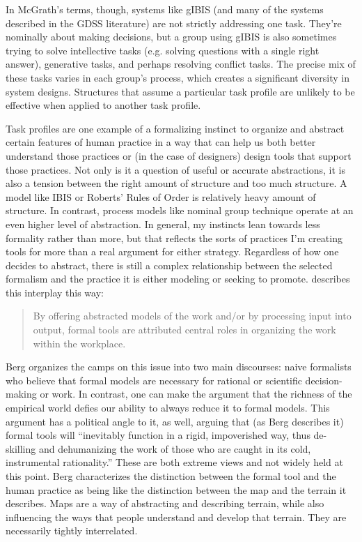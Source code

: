 In McGrath's terms, though, systems like gIBIS (and many of the systems described in the GDSS literature) are not strictly addressing one task. They're nominally about making decisions, but a group using gIBIS is also sometimes trying to solve intellective tasks (e.g. solving questions with a single right answer), generative tasks, and perhaps resolving conflict tasks. The precise mix of these tasks varies in each group's process, which creates a significant diversity in system designs. Structures that assume a particular task profile are unlikely to be effective when applied to another task profile.

Task profiles are one example of a formalizing instinct to organize and abstract certain features of human practice in a way that can help us both better understand those practices or (in the case of designers) design tools that support those practices. Not only is it a question of useful or accurate abstractions, it is also a tension between the right amount of structure and too much structure. A model like IBIS or Roberts' Rules of Order \citep{RobertIII:2000tq} is relatively heavy amount of structure. In contrast, process models like nominal group technique \citep{Bartunek:1984cq} operate at an even higher level of abstraction. In general, my instincts lean towards less formality rather than more, but that reflects the sorts of practices I'm creating tools for more than a real argument for either strategy. Regardless of how one decides to abstract, there is still a complex relationship between the selected formalism and the practice it is either modeling or seeking to promote. \citet{Berg:1997bs} describes this interplay this way:

\begin{quotation}
By offering abstracted models of the work and/or by processing input into output, formal tools are attributed central roles in organizing the work within the workplace.
\end{quotation}

Berg organizes the camps on this issue into two main discourses: naive formalists who believe that formal models are necessary for rational or scientific decision-making or work. In contrast, one can make the argument that the richness of the empirical world defies our ability to always reduce it to formal models. This argument has a political angle to it, as well, arguing that (as Berg describes it) formal tools will ``inevitably function in a rigid, impoverished way, thus de-skilling and dehumanizing the work of those who are caught in its cold, instrumental rationality.'' These are both extreme views and not widely held at this point. Berg characterizes the distinction between the formal tool and the human practice as being like the distinction between the map and the terrain it describes. Maps are a way of abstracting and describing terrain, while also influencing the ways that people understand and develop that terrain. They are necessarily tightly interrelated.

